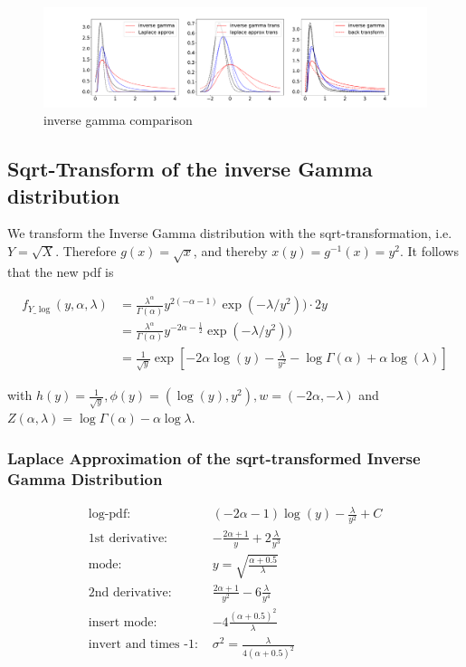 \begin{figure}
	\centering
	\includegraphics[width=\textwidth]{figures/inverse_gamma_playground.pdf}
	\caption{inverse gamma comparison}
	\label{fig:inverse_gamma_comparison}
\end{figure}

\subsection{Sqrt-Transform of the inverse Gamma distribution}

We transform the Inverse Gamma distribution with the sqrt-transformation, i.e. $Y = \sqrt{X}$. Therefore $g(x) = \sqrt{x}$, and thereby $x(y) = g^{-1}(x) = y^2$. It follows that the new pdf is 

\begin{align}
f_{Y\_\log}(y, \alpha, \lambda) &= \frac{\lambda^{\alpha}}{\Gamma(\alpha)} y^{2(-\alpha-1)} \exp(-\lambda/y^2)) \cdot 2y \\
&=  \frac{\lambda^{\alpha}}{\Gamma(\alpha)} y^{-2\alpha-\frac{1}{2}} \exp(-\lambda/y^2)) \\
&= \frac{1}{\sqrt{y}}\exp\left[-2\alpha \log(y) - \frac{\lambda}{y^2} - \log\Gamma(\alpha) + \alpha\log(\lambda)\right]
\label{eq:inv_gamma_sqrt_pdf}
\end{align}


with $h(y) = \frac{1}{\sqrt{y}}, \phi(y) = (\log(y), y^2), w=(-2\alpha, -\lambda)$ and $Z(\alpha, \lambda) = \log\Gamma(\alpha) - \alpha \log \lambda$.

\subsubsection{Laplace Approximation of the sqrt-transformed Inverse Gamma Distribution}

\begin{align*}
\text{log-pdf: } &(-2\alpha-1)\log(y) - \frac{\lambda}{y^2} + C \\
\text{1st derivative: }& -\frac{2\alpha+1}{y} + 2\frac{\lambda}{y^3} \\
\text{mode: }&  y = \sqrt{\frac{\alpha+0.5}{\lambda}}\\
\text{2nd derivative: }&  \frac{2\alpha+1}{y^2} - 6\frac{\lambda}{y^4}\\
\text{insert mode: }&  -4\frac{(\alpha+0.5)^2}{\lambda}\\
\text{invert and times -1: }&\sigma^2 = \frac{\lambda}{4 (\alpha+0.5)^2}
\end{align*}

